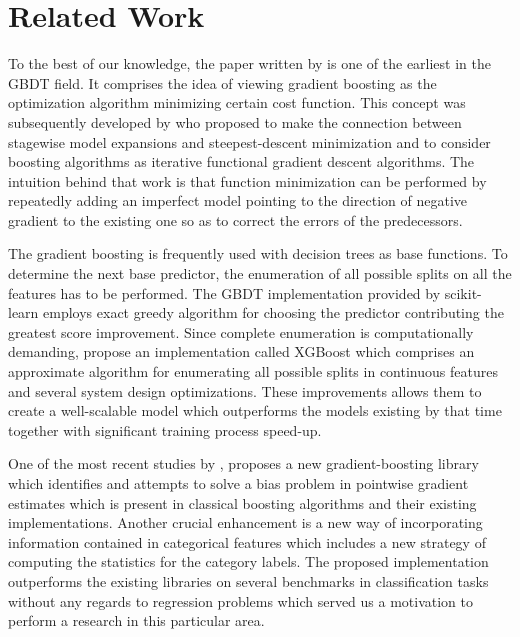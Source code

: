 \section{Related Work}
\label{sec:related-work}

To the best of our knowledge, the paper written by \citet{breiman1997arcing}  is one of the earliest in the GBDT field. It comprises the idea of viewing gradient boosting as the optimization algorithm minimizing certain cost function. This concept was subsequently developed by \citet{friedman2001greedy} who proposed to make the connection between stagewise model expansions and steepest-descent minimization and to consider boosting algorithms as iterative functional gradient descent algorithms. The intuition behind that work is that function minimization can be performed by repeatedly adding an imperfect model pointing to the direction of negative gradient to the existing one so as to correct the errors of the predecessors.

The gradient boosting is frequently used with decision trees as base functions. To determine the next base predictor, the enumeration of all possible splits on all the features has to be performed. The GBDT implementation provided by scikit-learn \cite{scikit-learn} employs exact greedy algorithm for choosing the predictor contributing the greatest score improvement. Since complete enumeration is computationally demanding, \citet{chen2016xgboost} propose an implementation called XGBoost which comprises an approximate algorithm for enumerating all possible splits in continuous features and several system design optimizations. These improvements allows them to create a well-scalable model which outperforms the models existing by that time together with significant training process speed-up.

One of the most recent studies by \citet{DBLP:journals/corr/DorogushGGKPV17}, \cite{dorogushcatboost} proposes a new gradient-boosting library which identifies and attempts to solve a bias problem in pointwise gradient estimates which is present in classical boosting algorithms and their existing implementations. Another crucial enhancement is a new way of incorporating information contained in categorical features which includes a new strategy of computing the statistics for the category labels. The proposed implementation outperforms the existing libraries on several benchmarks in classification tasks without any regards to regression problems which served us a motivation to perform a research in this particular area.